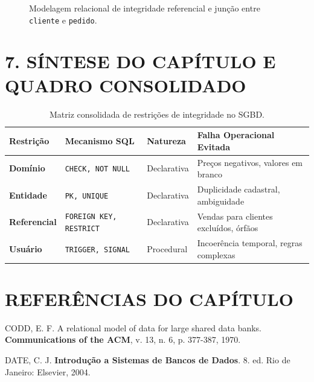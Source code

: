 \begin{figure}[htbp]
\caption{Modelagem relacional de integridade referencial e junção entre \texttt{cliente} e \texttt{pedido}.}
\label{fig:fk_cliente_pedido}
\end{figure}

\newpage

\section*{7. SÍNTESE DO CAPÍTULO E QUADRO CONSOLIDADO}

\begin{table}[h!]
\centering
\small
\begin{tabular}{|l|l|l|l|}
\hline
\textbf{Restrição} & \textbf{Mecanismo SQL} & \textbf{Natureza} & \textbf{Falha Operacional Evitada} \\ \hline
\textbf{Domínio} & \texttt{CHECK, NOT NULL} & Declarativa & Preços negativos, valores em branco \\ \hline
\textbf{Entidade} & \texttt{PK, UNIQUE} & Declarativa & Duplicidade cadastral, ambiguidade \\ \hline
\textbf{Referencial} & \texttt{FOREIGN KEY, RESTRICT} & Declarativa & Vendas para clientes excluídos, órfãos \\ \hline
\textbf{Usuário} & \texttt{TRIGGER, SIGNAL} & Procedural & Incoerência temporal, regras complexas \\ \hline
\end{tabular}
\caption{Matriz consolidada de restrições de integridade no SGBD.}
\end{table}

\section*{REFERÊNCIAS DO CAPÍTULO}

\noindent CODD, E. F. A relational model of data for large shared data banks. \textbf{Communications of the ACM}, v. 13, n. 6, p. 377-387, 1970.

\vspace{0.8em}
\noindent DATE, C. J. \textbf{Introdução a Sistemas de Bancos de Dados}. 8. ed. Rio de Janeiro: Elsevier, 2004.

